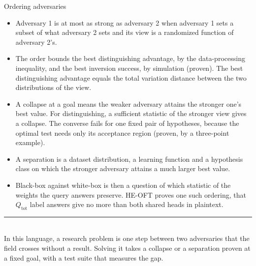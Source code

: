 \documentclass[aspectratio=169,10pt]{beamer}
\newcommand{\redline}{\textcolor{kred}{\rule{\textwidth}{1pt}}}
\newcommand{\Qtot}{Q_{\mathrm{tot}}}
\begin{document}
\begin{frame}{Ordering adversaries}
  \small
  \begin{itemize}
    \item Adversary 1 is at most as strong as adversary 2 when adversary 1 sets a subset of what adversary 2 sets and its view is a randomized function of adversary 2's.
    \item The order bounds the best distinguishing advantage, by the data-processing inequality, and the best inversion success, by simulation (proven). The best distinguishing advantage equals the total variation distance between the two distributions of the view.
    \item A collapse at a goal means the weaker adversary attains the stronger one's best value. For distinguishing, a sufficient statistic of the stronger view gives a collapse. The converse fails for one fixed pair of hypotheses, because the optimal test needs only its acceptance region (proven, by a three-point example).
    \item A separation is a dataset distribution, a learning function and a hypothesis class on which the stronger adversary attains a much larger best value.
    \item Black-box against white-box is then a question of which statistic of the weights the query answers preserve. HE-OFT proves one such ordering, that $\Qtot$ label answers give no more than both shared heads in plaintext.
  \end{itemize}
  \vspace{0.4em}
  \redline\\[0.4em]
  In this language, a research problem is one step between two adversaries that the field crosses without a result. Solving it takes a collapse or a separation proven at a fixed goal, with a test suite that measures the gap.
\end{frame}
\end{document}
